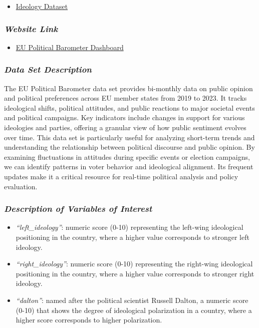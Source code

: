 \documentclass[
]{article}
\providecommand{\tightlist}{%
  \setlength{\itemsep}{0pt}\setlength{\parskip}{0pt}}\usepackage{longtable,booktabs,array}
\begin{document}
\begin{itemize}
\tightlist
\item
  \href{https://eupoliticalbarometer.uc3m.es/api/ideologyDownload}{Ideology
  Dataset}
\end{itemize}

\subsubsection{\texorpdfstring{\emph{Website
Link}}{Website Link}}\label{website-link-3}

\begin{itemize}
\tightlist
\item
  \href{https://eupoliticalbarometer.uc3m.es/dashboard/ideology}{EU
  Political Barometer Dashboard}
\end{itemize}

\subsubsection{\texorpdfstring{\emph{Data Set
Description}}{Data Set Description}}\label{data-set-description-3}

The EU Political Barometer data set provides bi-monthly data on public
opinion and political preferences across EU member states from 2019 to
2023. It tracks ideological shifts, political attitudes, and public
reactions to major societal events and political campaigns. Key
indicators include changes in support for various ideologies and
parties, offering a granular view of how public sentiment evolves over
time. This data set is particularly useful for analyzing short-term
trends and understanding the relationship between political discourse
and public opinion. By examining fluctuations in attitudes during
specific events or election campaigns, we can identify patterns in voter
behavior and ideological alignment. Its frequent updates make it a
critical resource for real-time political analysis and policy
evaluation.

\subsubsection{\texorpdfstring{\emph{Description of Variables of
Interest}}{Description of Variables of Interest}}\label{description-of-variables-of-interest-3}

\begin{itemize}
\tightlist
\item
  \emph{``left\_ideology''}: numeric score (0-10) representing the
  left-wing ideological positioning in the country, where a higher value
  corresponds to stronger left ideology.
\item
  \emph{``right\_ideology''}: numeric score (0-10) representing the
  right-wing ideological positioning in the country, where a higher
  value corresponds to stronger right ideology.
\item
  \emph{``dalton''}: named after the political scientist Russell Dalton,
  a numeric score (0-10) that shows the degree of ideological
  polarization in a country, where a higher score corresponds to higher
  polarization.
\end{itemize}
\end{document}
